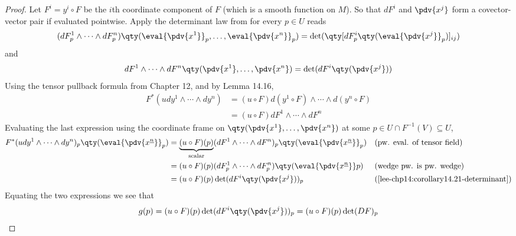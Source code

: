 \documentclass[../main-v2-manifolds.tex]{subfiles}
\begin{document}
\begin{proof}
        Let $F^i = y^i\circ F$ be the $i$th coordinate component of $F$ (which is a smooth function on $M$). So that $dF^i$ and $\pdv{x^j}$ form a covector-vector pair if evaluated pointwise. Apply the determinant law from  for every $p\in U$ reads
        \begin{equation}\label{lee-chp14:corollary14.21-determinant}
            (dF^1_p\wedge\cdots\wedge dF^n_p)\qty(\eval{\pdv{x^1}}_{p},\ldots,\eval{\pdv{x^n}}_{p}) = \det(\qty[dF^i_p\qty(\eval{\pdv{x^j}}_p)]_{ij})
        \end{equation}
        and
        \[
            dF^1\wedge\cdots\wedge dF^n\qty(\pdv{x^1},\ldots,\pdv{x^n}) = \det(dF^i\qty(\pdv{x^j}))
        \]
        Using the tensor pullback formula from Chapter 12, and by Lemma 14.16, 
        \begin{align*}
            F^*(udy^1\wedge\cdots\wedge dy^n) &= (u\circ F)d(y^1\circ F)\wedge\cdots\wedge d(y^n\circ F)\\
            &= (u\circ F)dF^1\wedge\cdots\wedge dF^n
        \end{align*}
        Evaluating the last expression using the coordinate frame on   $\qty(\pdv{x^1},\ldots,\pdv{x^n})$ at some $p\in U\cap F^{-1}(V)\subseteq U$,
        \begin{align*}
            F^*(udy^1\wedge\cdots\wedge dy^n)_p\qty(\eval{\pdv{x^{\underline{n}}}}_p) &= \underbrace{(u\circ F)(p)}_{\text{scalar}}(dF^1\wedge\cdots\wedge dF^n)_p\qty(\eval{\pdv{x^{\underline{n}}}}_{p}) && \text{(pw. eval. of tensor field)}\\
            &= (u\circ F)(p)(dF^1_p\wedge\cdots\wedge dF^n_p)\qty(\eval{\pdv{x^{\underline{n}}}}p) && \text{(wedge pw. is pw. wedge)}\\
            &= (u\circ F)(p)\det(dF^{i}\qty(\pdv{x^j}))_p && \text{(\Cref{lee-chp14:corollary14.21-determinant})}
        \end{align*}
        Equating the two expressions we see that
        \[
            g(p) = (u\circ F)(p)\det(dF^{i}\qty(\pdv{x^j}))_p = (u\circ F)(p)\det(DF)_p
        \]
    \end{proof}
\end{document}
